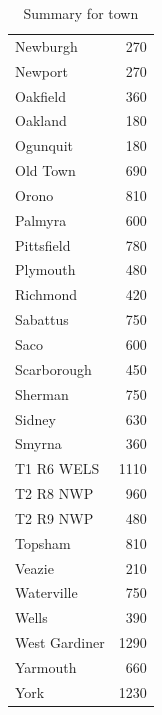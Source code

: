 \begin{table}[ht]
\begin{tabular}{lr}
  Newburgh & 270 \\ 
  Newport & 270 \\ 
  Oakfield & 360 \\ 
  Oakland & 180 \\ 
  Ogunquit & 180 \\ 
  Old Town & 690 \\ 
  Orono & 810 \\ 
  Palmyra & 600 \\ 
  Pittsfield & 780 \\ 
  Plymouth & 480 \\ 
  Richmond & 420 \\ 
  Sabattus & 750 \\ 
  Saco & 600 \\ 
  Scarborough & 450 \\ 
  Sherman & 750 \\ 
  Sidney & 630 \\ 
  Smyrna & 360 \\ 
  T1 R6 WELS & 1110 \\ 
  T2 R8 NWP & 960 \\ 
  T2 R9 NWP & 480 \\ 
  Topsham & 810 \\ 
  Veazie & 210 \\ 
  Waterville & 750 \\ 
  Wells & 390 \\ 
  West Gardiner & 1290 \\ 
  Yarmouth & 660 \\ 
  York & 1230 \\ 
   \hline
\end{tabular}
\caption{Summary for town} 
\label{tab: town}
\end{table}
